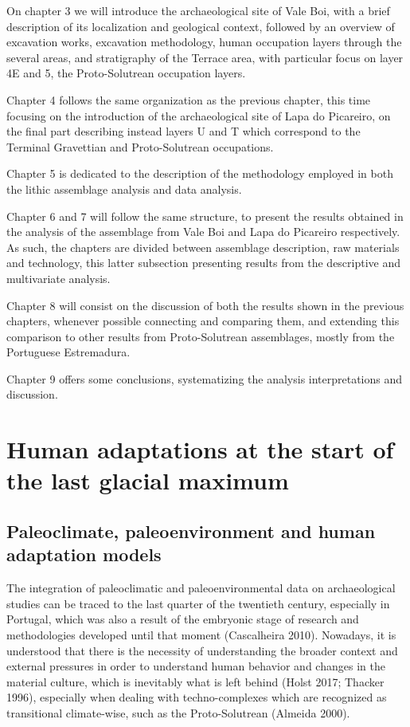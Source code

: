 \documentclass[12pt,twoside]{reedthesis}
\begin{document}
On chapter 3 we will introduce the archaeological site of Vale Boi, with a brief description of its localization and geological context, followed by an overview of excavation works, excavation methodology, human occupation layers through the several areas, and stratigraphy of the Terrace area, with particular focus on layer 4E and 5, the Proto-Solutrean occupation layers.

Chapter 4 follows the same organization as the previous chapter, this time focusing on the introduction of the archaeological site of Lapa do Picareiro, on the final part describing instead layers U and T which correspond to the Terminal Gravettian and Proto-Solutrean occupations.

Chapter 5 is dedicated to the description of the methodology employed in both the lithic assemblage analysis and data analysis.

Chapter 6 and 7 will follow the same structure, to present the results obtained in the analysis of the assemblage from Vale Boi and Lapa do Picareiro respectively. As such, the chapters are divided between assemblage description, raw materials and technology, this latter subsection presenting results from the descriptive and multivariate analysis.

Chapter 8 will consist on the discussion of both the results shown in the previous chapters, whenever possible connecting and comparing them, and extending this comparison to other results from Proto-Solutrean assemblages, mostly from the Portuguese Estremadura.

Chapter 9 offers some conclusions, systematizing the analysis interpretations and discussion.

\hypertarget{human-adaptations-at-the-start-of-the-last-glacial-maximum}{%
\chapter{Human adaptations at the start of the last glacial maximum}\label{human-adaptations-at-the-start-of-the-last-glacial-maximum}}

\hypertarget{paleoclimate-paleoenvironment-and-human-adaptation-models}{%
\section{Paleoclimate, paleoenvironment and human adaptation models}\label{paleoclimate-paleoenvironment-and-human-adaptation-models}}

The integration of paleoclimatic and paleoenvironmental data on archaeological studies can be traced to the last quarter of the twentieth century, especially in Portugal, which was also a result of the embryonic stage of research and methodologies developed until that moment (Cascalheira 2010). Nowadays, it is understood that there is the necessity of understanding the broader context and external pressures in order to understand human behavior and changes in the material culture, which is inevitably what is left behind (Holst 2017; Thacker 1996), especially when dealing with techno-complexes which are recognized as transitional climate-wise, such as the Proto-Solutrean (Almeida 2000).
\end{document}
